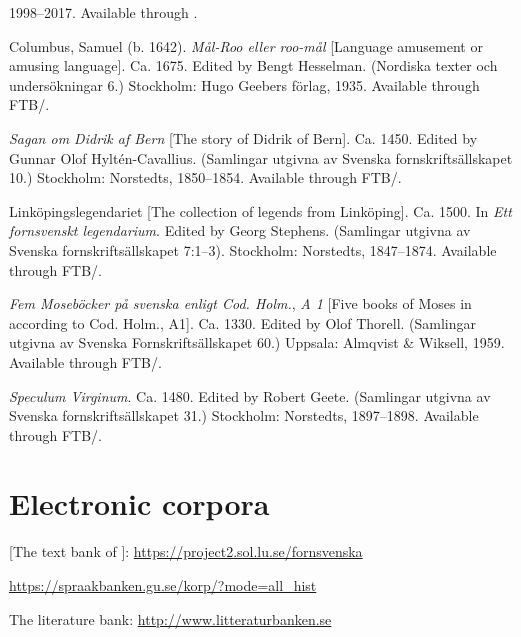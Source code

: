 \documentclass[output=paper, colorlinks, citecolor=brown]{langscibook}
\begin{document}
\begin{description}[font=\normalfont]\sloppy
\item[Bloggmix] [A selection of \ili{Swedish} blogs] 1998–2017. Available through .
\item[Columbus:]Columbus, Samuel (b. 1642). \textit{Mål-Roo eller roo-mål} [Language amusement or amusing language]. Ca. 1675. Edited by Bengt Hesselman. (Nordiska texter och undersökningar 6.) Stockholm: Hugo Geebers förlag, 1935. Available through FTB/.
\item[Di:]\textit{Sagan om Didrik af Bern} [The story of Didrik of Bern]. Ca. 1450. Edited by Gunnar Olof Hyltén-Cavallius. (Samlingar utgivna av Svenska fornskriftsällskapet 10.) Stockholm: Norstedts, 1850–1854. Available through FTB/.
\item[LinLeg:]Linköpingslegendariet [The collection of legends from Linköping]. Ca. 1500. In \textit{Ett fornsvenskt legendarium}. Edited by Georg Stephens. (Samlingar utgivna av Svenska fornskriftsällskapet 7:1–3). Stockholm: Norstedts, 1847–1874. Available through FTB/.
\item[MB1B:]\textit{Fem Moseböcker på svenska enligt Cod. Holm.}, \textit{A 1} [Five books of Moses in  according to Cod. Holm., A1]. Ca. 1330. Edited by Olof Thorell. (Samlingar utgivna av Svenska Fornskriftsällskapet 60.) Uppsala: Almqvist \& Wiksell, 1959. Available through FTB/.
\item[SpecV:]\textit{Speculum Virginum}. Ca. 1480. Edited by Robert Geete. (Samlingar utgivna av Svenska fornskriftsällskapet 31.) Stockholm: Norstedts, 1897–1898. Available through FTB/.
\end{description}

\section*{Electronic corpora}

\begin{description}[font=\normalfont]\sloppy
\item[FTB:]  [The text bank of ]:  \url{https://project2.sol.lu.se/fornsvenska} 
\item[\isi{Korp}:] \url{https://spraakbanken.gu.se/korp/?mode=all_hist}
\item[LB:] The  literature bank: \url{http://www.litteraturbanken.se}
\end{description}

{\sloppy\printbibliography[heading=subbibliography,notkeyword=this]}
\end{document}
